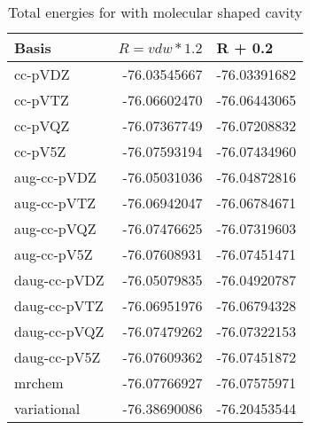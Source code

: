 \documentclass[../Thesis.tex]{subfiles}
\begin{document}
\begin{table}[htbp]
\caption{Total energies for  with molecular shaped cavity}
\begin{tabular}{l|r|r}
Basis & \multicolumn{1}{l|}{$R = vdw*1.2$} & \multicolumn{1}{l|}{R + 0.2} \\ \hline
cc-pVDZ & -76.03545667 & -76.03391682 \\ \hline
cc-pVTZ & -76.06602470 & -76.06443065 \\
cc-pVQZ & -76.07367749 & -76.07208832 \\
cc-pV5Z & -76.07593194 & -76.07434960 \\ \hline
aug-cc-pVDZ & -76.05031036 & -76.04872816 \\
aug-cc-pVTZ & -76.06942047 & -76.06784671 \\
aug-cc-pVQZ & -76.07476625 & -76.07319603 \\
aug-cc-pV5Z & -76.07608931 & -76.07451471 \\ \hline
daug-cc-pVDZ & -76.05079835 & -76.04920787 \\
daug-cc-pVTZ & -76.06951976 & -76.06794328 \\
daug-cc-pVQZ & -76.07479262 & -76.07322153 \\
daug-cc-pV5Z & -76.07609362 & -76.07451872 \\ \hline
mrchem & -76.07766927 & -76.07575971 \\
variational & -76.38690086 & -76.20453544 \\
\end{tabular}
\label{tab:watrawdataabc}
\end{table}
\end{document}
